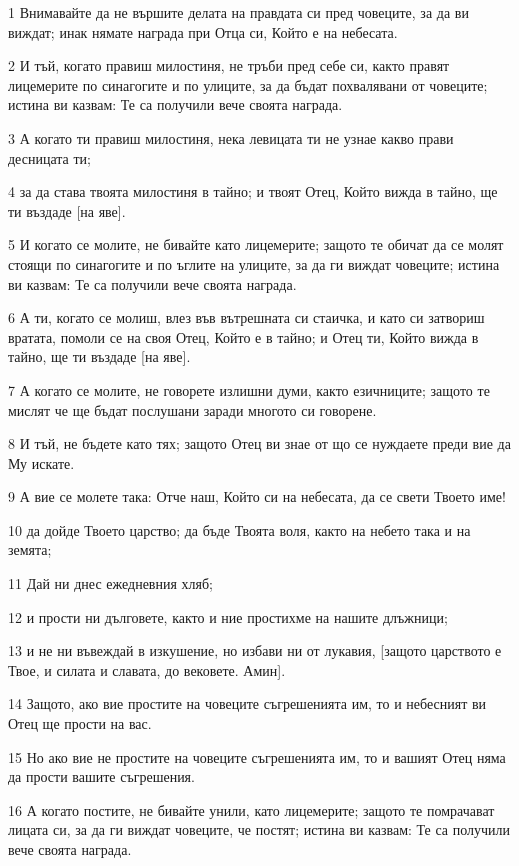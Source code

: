 \par 1 Внимавайте да не вършите делата на правдата си пред човеците, за да ви виждат; инак нямате награда при Отца си, Който е на небесата.
\par 2 И тъй, когато правиш милостиня, не тръби пред себе си, както правят лицемерите по синагогите и по улиците, за да бъдат похвалявани от човеците; истина ви казвам: Те са получили вече своята награда.
\par 3 А когато ти правиш милостиня, нека левицата ти не узнае какво прави десницата ти;
\par 4 за да става твоята милостиня в тайно; и твоят Отец, Който вижда в тайно, ще ти въздаде [на яве].
\par 5 И когато се молите, не бивайте като лицемерите; защото те обичат да се молят стоящи по синагогите и по ъглите на улиците, за да ги виждат човеците; истина ви казвам: Те са получили вече своята награда.
\par 6 А ти, когато се молиш, влез във вътрешната си стаичка, и като си затвориш вратата, помоли се на своя Отец, Който е в тайно; и Отец ти, Който вижда в тайно, ще ти въздаде [на яве].
\par 7 А когато се молите, не говорете излишни думи, както езичниците; защото те мислят че ще бъдат послушани заради многото си говорене.
\par 8 И тъй, не бъдете като тях; защото Отец ви знае от що се нуждаете преди вие да Му искате.
\par 9 А вие се молете така: Отче наш, Който си на небесата, да се свети Твоето име!
\par 10 да дойде Твоето царство; да бъде Твоята воля, както на небето така и на земята;
\par 11 Дай ни днес ежедневния хляб;
\par 12 и прости ни дълговете, както и ние простихме на нашите длъжници;
\par 13 и не ни въвеждай в изкушение, но избави ни от лукавия, [защото царството е Твое, и силата и славата, до вековете. Амин].
\par 14 Защото, ако вие простите на човеците съгрешенията им, то и небесният ви Отец ще прости на вас.
\par 15 Но ако вие не простите на човеците съгрешенията им, то и вашият Отец няма да прости вашите съгрешения.
\par 16 А когато постите, не бивайте унили, като лицемерите; защото те помрачават лицата си, за да ги виждат човеците, че постят; истина ви казвам: Те са получили вече своята награда.
